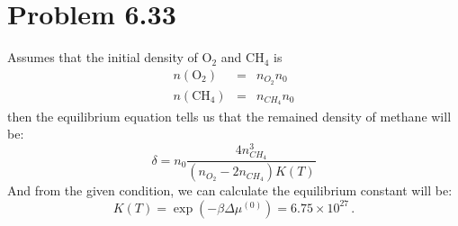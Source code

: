 \documentclass{article}
\begin{document}
\section*{Problem 6.33}
Assumes that the initial density of $\mathrm{O}_2$ and $\mathrm{CH}_4$ is 
\begin{eqnarray*}
n(\mathrm{O}_2) &=& n_{O_2}n_0\\
n(\mathrm{CH}_4)&=& n_{CH_4}n_0
\end{eqnarray*}
then the equilibrium equation tells us that the remained density of methane will be:
\begin{equation}
\delta = n_0 \frac{4n_{CH_4}^3}{(n_{O_2}-2n_{CH_4})K(T)}
\end{equation}
And from the given condition, we can calculate the equilibrium constant will be:
\begin{equation}
K(T) = \exp\left(-\beta \Delta \mu^{(0)}\right) = 6.75\times 10^{27}\,.
\end{equation}
\end{document}
